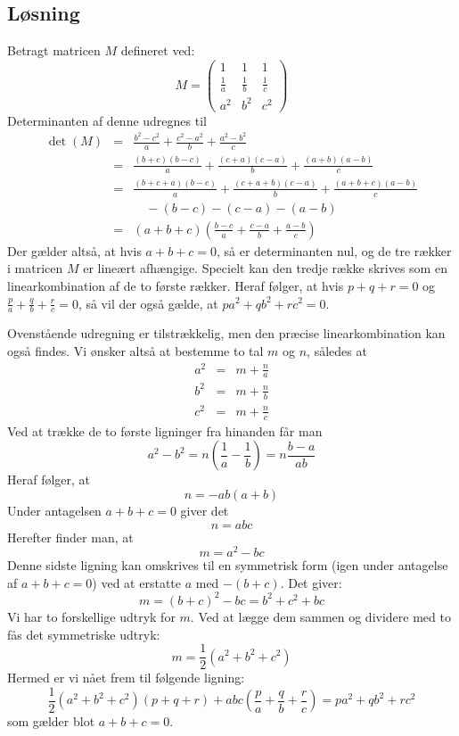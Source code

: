 \documentclass[12pt,oneside,a4paper]{article}
\newcommand{\bas}{\begin{eqnarray*}}
\newcommand{\eas}{\end{eqnarray*}}
\begin{document}
\subsection{Løsning}
Betragt matricen $M$ defineret ved:
$$
M = \left(\begin{array}{ccc}
    1 & 1 & 1 \\
    \frac{1}{a} & \frac{1}{b} & \frac{1}{c} \\
    a^2 & b^2 & c^2 
\end{array}
\right)
$$
Determinanten af denne udregnes til
\bas
\det(M) &=& \frac{b^2-c^2}{a} + \frac{c^2-a^2}{b} + \frac{a^2-b^2}{c} \\
        &=& \frac{(b+c)(b-c)}{a} + \frac{(c+a)(c-a)}{b} + \frac{(a+b)(a-b)}{c} \\
        &=& \frac{(b+c+a)(b-c)}{a} + \frac{(c+a+b)(c-a)}{b} + \frac{(a+b+c)(a-b)}{c} \\
        && \quad -(b-c) - (c-a) - (a-b) \\
        &=& (a+b+c) \left( \frac{b-c}{a} + \frac{c-a}{b} + \frac{a-b}{c}\right)
\eas
Der gælder altså, at hvis $a+b+c=0$, så er determinanten nul, og de tre rækker i matricen $M$ er lineært afhængige. Specielt kan den tredje række skrives som en linearkombination af de to første rækker.
Heraf følger, at hvis $p+q+r=0$ og $\frac{p}{a} + \frac{q}{b} + \frac{r}{c}=0$, så vil der også gælde, at $pa^2+qb^2+rc^2=0$.

Ovenstående udregning er tilstrækkelig, men den præcise linearkombination kan også findes. Vi ønsker altså at bestemme to tal $m$ og $n$, således at
\bas
a^2 &=& m+\frac{n}{a} \\
b^2 &=& m+\frac{n}{b} \\
c^2 &=& m+\frac{n}{c} 
\eas
Ved at trække de to første ligninger fra hinanden får man
$$
a^2-b^2 = n\left(\frac{1}{a}-\frac{1}{b}\right) = n \frac{b-a}{ab}
$$
Heraf følger, at 
$$
n = -ab(a+b)
$$
Under antagelsen $a+b+c=0$ giver det
$$
n=abc
$$
Herefter finder man, at
$$
m=a^2-bc
$$
Denne sidste ligning kan omskrives til en symmetrisk form (igen under antagelse af $a+b+c=0$) ved at erstatte $a$ med $-(b+c)$. Det giver:
$$
m=(b+c)^2-bc = b^2+c^2+bc
$$
Vi har to forskellige udtryk for $m$. Ved at lægge dem sammen og dividere med to fås det symmetriske udtryk:
$$
m=\frac{1}{2} (a^2+b^2+c^2)
$$
Hermed er vi nået frem til følgende ligning:
$$
\frac{1}{2} (a^2+b^2+c^2) (p+q+r) + abc \left(\frac{p}{a} + \frac{q}{b} + \frac{r}{c} \right) = pa^2+qb^2+rc^2
$$
som gælder blot $a+b+c=0$.
\end{document}
